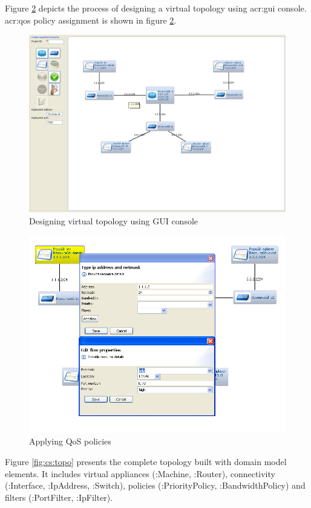 \documentclass[11pt,openany]{book}
\begin{document}
        Figure \ref{fig:cs:gui-design} depicts the process of designing a virtual topology using \gls{acr:gui} console.
        \gls{acr:qos} policy assignment is shown in figure \ref{fig:cs:gui-design}.

        \begin{figure}[H]
          \centering
          \includegraphics[width=.7\textwidth]{img/test-case/gui-design.png}

          \caption{Designing virtual topology using GUI console}
          \label{fig:cs:gui-design}
        \end{figure}

        \begin{figure}[H]
          \centering
          \includegraphics[width=.7\textwidth]{img/test-case/gui-qos.png}

          \caption{Applying QoS policies}
          \label{fig:cs:gui-design}
        \end{figure}

        Figure \ref{fig:cs:topo} presents the complete topology built with domain model elements. It includes virtual
        appliances (:Machine, :Router), connectivity (:Interface, :IpAddress, :Switch), policies (:PriorityPolicy,
        :BandwidthPolicy) and filters (:PortFilter, :IpFilter).
\end{document}
